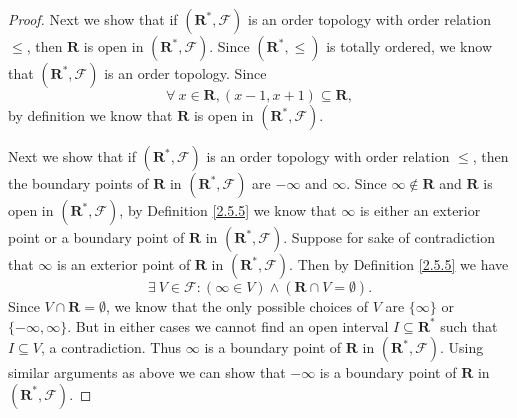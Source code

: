 \begin{proof}
    Next we show that if \((\mathbf{R}^*, \mathcal{F})\) is an order topology with order relation \(\leq\), then \(\mathbf{R}\) is open in \((\mathbf{R}^*, \mathcal{F})\).
    Since \((\mathbf{R}^*, \leq)\) is totally ordered, we know that \((\mathbf{R}^*, \mathcal{F})\) is an order topology.
    Since
    \[
        \forall\ x \in \mathbf{R}, (x - 1, x + 1) \subseteq \mathbf{R},
    \]
    by definition we know that \(\mathbf{R}\) is open in \((\mathbf{R}^*, \mathcal{F})\).

    Next we show that if \((\mathbf{R}^*, \mathcal{F})\) is an order topology with order relation \(\leq\), then the boundary points of \(\mathbf{R}\) in \((\mathbf{R}^*, \mathcal{F})\) are \(-\infty\) and \(\infty\).
    Since \(\infty \notin \mathbf{R}\) and \(\mathbf{R}\) is open in \((\mathbf{R}^*, \mathcal{F})\), by Definition \ref{2.5.5} we know that \(\infty\) is either an exterior point or a boundary point of \(\mathbf{R}\) in \((\mathbf{R}^*, \mathcal{F})\).
    Suppose for sake of contradiction that \(\infty\) is an exterior point of \(\mathbf{R}\) in \((\mathbf{R}^*, \mathcal{F})\).
    Then by Definition \ref{2.5.5} we have
    \[
        \exists\ V \in \mathcal{F} : (\infty \in V) \land (\mathbf{R} \cap V = \emptyset).
    \]
    Since \(V \cap \mathbf{R} = \emptyset\), we know that the only possible choices of \(V\) are \(\{\infty\}\) or \(\{-\infty, \infty\}\).
    But in either cases we cannot find an open interval \(I \subseteq \mathbf{R}^*\) such that \(I \subseteq V\), a contradiction.
    Thus \(\infty\) is a boundary point of \(\mathbf{R}\) in \((\mathbf{R}^*, \mathcal{F})\).
    Using similar arguments as above we can show that \(-\infty\) is a boundary point of \(\mathbf{R}\) in \((\mathbf{R}^*, \mathcal{F})\).


\end{proof}
